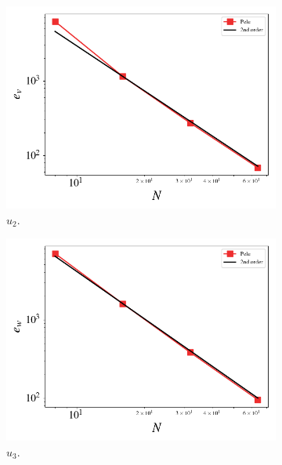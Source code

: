 \documentclass[10pt]{article}
\begin{document}
\begin{figure}
\begin{subfigure}[b]{0.49\textwidth}
    \includegraphics[width=\textwidth]{./v_error.png}%
    \caption{$u_2$.}%
    \label{fig:}%
  \end{subfigure}\hfill%
  \begin{subfigure}[b]{0.49\textwidth}%
    \includegraphics[width=\textwidth]{./w_error.png}%
    \caption{$u_3$.}%
    \label{fig:}%
  \end{subfigure}\hfill%
  \begin{subfigure}[b]{0.49\textwidth}%

\end{subfigure}
\end{figure}
\end{document}
